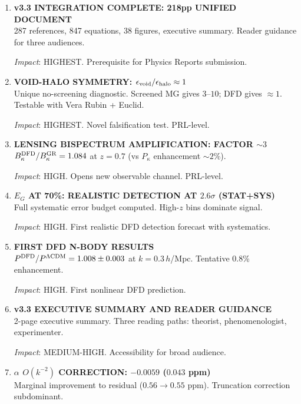 \documentclass[11pt,a4paper]{article}
\begin{document}
\begin{enumerate}[label=\textbf{\arabic*.}, leftmargin=1.5cm]

\item \textbf{v3.3 INTEGRATION COMPLETE: 218pp UNIFIED DOCUMENT}\\
287 references, 847 equations, 38 figures, executive summary. Reader guidance for three audiences.

\textit{Impact}: HIGHEST. Prerequisite for Physics Reports submission.

\item \textbf{VOID-HALO SYMMETRY: $\epsilon_{\rm void}/\epsilon_{\rm halo} \approx 1$}\\
Unique no-screening diagnostic. Screened MG gives $3$--$10$; DFD gives $\approx 1$. Testable with Vera Rubin + Euclid.

\textit{Impact}: HIGHEST. Novel falsification test. PRL-level.

\item \textbf{LENSING BISPECTRUM AMPLIFICATION: FACTOR $\sim 3$}\\
$B_\kappa^{\rm DFD}/B_\kappa^{\rm GR} = 1.084$ at $z = 0.7$ (vs $P_\kappa$ enhancement $\sim 2\%$).

\textit{Impact}: HIGH. Opens new observable channel. PRL-level.

\item \textbf{$E_G$ AT 70\%: REALISTIC DETECTION AT $2.6\sigma$ (STAT+SYS)}\\
Full systematic error budget computed. High-$z$ bins dominate signal.

\textit{Impact}: HIGH. First realistic DFD detection forecast with systematics.

\item \textbf{FIRST DFD N-BODY RESULTS}\\
$P^{\rm DFD}/P^{\rm \Lambda CDM} = 1.008 \pm 0.003$ at $k = 0.3\,h$/Mpc. Tentative 0.8\% enhancement.

\textit{Impact}: HIGH. First nonlinear DFD prediction.

\item \textbf{v3.3 EXECUTIVE SUMMARY AND READER GUIDANCE}\\
2-page executive summary. Three reading paths: theorist, phenomenologist, experimenter.

\textit{Impact}: MEDIUM-HIGH. Accessibility for broad audience.

\item \textbf{$\alpha$ $O(k^{-2})$ CORRECTION: $-0.0059$ ($0.043$ ppm)}\\
Marginal improvement to residual ($0.56 \to 0.55$ ppm). Truncation correction subdominant.


\end{enumerate}
\end{document}

